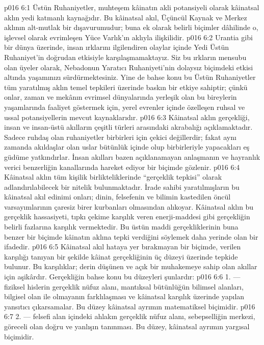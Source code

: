\vs p016 6:1 Üstün Ruhaniyetler, muhteşem kâinatın akli potansiyeli olarak kâinatsal aklın yedi katmanlı kaynağıdır. Bu kâinatsal akıl, Üçüncül Kaynak ve Merkez aklının alt\hyp{}mutlak bir dışavurumudur; buna ek olarak belirli biçimler dâhilinde o, işlevsel olarak evrimleşen Yüce Varlık’ın aklıyla ilişkilidir.
\vs p016 6:2 Urantia gibi bir dünya üzerinde, insan ırklarını ilgilendiren olaylar içinde Yedi Üstün Ruhaniyet’in doğrudan etkisiyle karşılaşmamaktayız. Siz bu ırkların mensubu olan üyeler olarak, Nebadonun Yaratıcı Ruhaniyeti’nin dolaysız biçimdeki etkisi altında yaşamınızı sürdürmektesiniz. Yine de bahse konu bu Üstün Ruhaniyetler tüm yaratılmış aklın temel tepkileri üzerinde baskın bir etkiye sahiptir; çünkü onlar, zaman ve mekânın evrimsel dünyalarında yerleşik olan bu bireylerin yaşamlarında faaliyet göstermek için, yerel evrenler içinde özelleşen ruhsal ve ussal potansiyellerin mevcut kaynaklarıdır.
\vs p016 6:3 Kâinatsal aklın gerçekliği, insan ve insan\hyp{}üstü akılların çeşitli türleri arasındaki akrabalığı açıklamaktadır. Sadece ruhdaş olan ruhaniyetler birbirleri için çekici değillerdir; fakat aynı zamanda akıldaşlar olan uslar bütünlük içinde olup birbirleriyle yapacakları eş güdüme yatkındırlar. İnsan akılları bazen açıklanamayan anlaşmanın ve hayranlık verici benzerliğin kanallarında hareket ediyor bir biçimde gözlenir.
\vs p016 6:4 Kâinatsal aklın tüm kişilik birlikteliklerinde “gerçeklik tepkisi” olarak adlandırılabilecek bir nitelik bulunmaktadır. İrade sahibi yaratılmışların bu kâinatsal akıl edinimi onları; dinin, felsefenin ve bilimin kastedilen öncül varsayımlarının çaresiz birer kurbanları olmasından alıkoyar. Kâinatsal aklın bu gerçeklik hassasiyeti, tıpkı çekime karşılık veren enerji\hyp{}maddesi gibi gerçekliğin belirli fazlarına karşılık vermektedir. Bu üstün maddi gerçekliklerinin buna benzer bir biçimde kâinatın aklına tepki verdiğini söylemek daha yerinde olan bir ifadedir.
\vs p016 6:5 Kâinatsal akıl hataya yer bırakmayan bir biçimde, verilen karşılığı tanıyan bir şekilde kâinat gerçekliğinin üç düzeyi üzerinde tepkide bulunur. Bu karşılıklar; derin düşünen ve açık bir muhakemeye sahip olan akıllar için aşikârdır. Gerçekliğin bahse konu bu düzeyleri şunlardır:
\vs p016 6:6 1.\bibnobreakspace {} --- fiziksel hislerin gerçeklik nüfuz alanı, mantıksal bütünlüğün bilimsel alanları, bilgisel olan ile olmayanın farklılaşması ve kâinatsal karşılık üzerinde yapılan yansıtıcı çıkarsamalar. Bu düzey kâinatsal ayrımın matematiksel biçimidir.
\vs p016 6:7 2.\bibnobreakspace {} --- felsefi alan içindeki ahlakın gerçeklik nüfuz alanı, sebepselliğin merkezi, göreceli olan doğru ve yanlışın tanınması. Bu düzey, kâinatsal ayrımın yargısal biçimidir.
